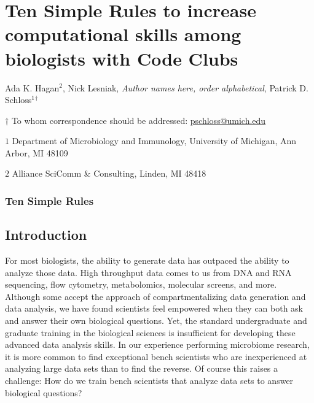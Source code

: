 \documentclass[
  11pt,
]{article}
\author{}
\date{\vspace{-2.5em}}
\begin{document}
\vspace*{5mm}

\hypertarget{ten-simple-rules-to-increase-computational-skills-among-biologists-with-code-clubs}{%
\section{Ten Simple Rules to increase computational skills among
biologists with Code
Clubs}\label{ten-simple-rules-to-increase-computational-skills-among-biologists-with-code-clubs}}

\vspace{25mm}

Ada K. Hagan\({^2}\), Nick Lesniak, \emph{Author names here, order
alphabetical}, Patrick D. Schloss\({^1}\)\({^\dagger}\)

\vspace{40mm}

\(\dagger\) To whom correspondence should be addressed:
\href{mailto:pschloss@umich.edu}{pschloss@umich.edu}

\(1\) Department of Microbiology and Immunology, University of Michigan,
Ann Arbor, MI 48109

\(2\) Alliance SciComm \& Consulting, Linden, MI 48418

\vspace{35mm}

\hypertarget{ten-simple-rules}{%
\subsubsection{Ten Simple Rules}\label{ten-simple-rules}}

\newpage
\linenumbers

\hypertarget{introduction}{%
\subsection{Introduction}\label{introduction}}

For most biologists, the ability to generate data has outpaced the
ability to analyze those data. High throughput data comes to us from DNA
and RNA sequencing, flow cytometry, metabolomics, molecular screens, and
more. Although some accept the approach of compartmentalizing data
generation and data analysis, we have found scientists feel empowered
when they can both ask and answer their own biological questions. Yet,
the standard undergraduate and graduate training in the biological
sciences is insufficient for developing these advanced data analysis
skills. In our experience performing microbiome research, it is more
common to find exceptional bench scientists who are inexperienced at
analyzing large data sets than to find the reverse. Of course this
raises a challenge: How do we train bench scientists that analyze data
sets to answer biological questions?
\end{document}
